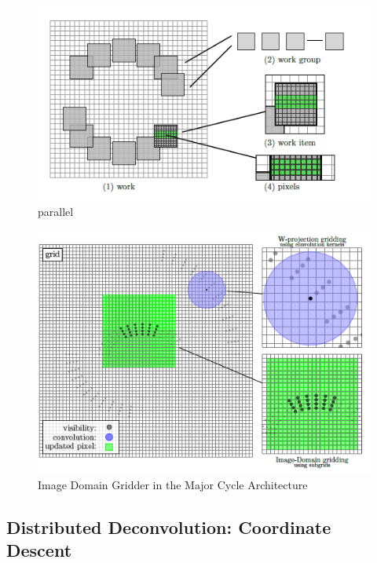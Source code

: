 \begin{figure}[h]
	\centering
	\includegraphics[width=0.40\linewidth]{./chapters/03.distribution/idg/paralellization.png}
	\caption{parallel}
	\label{distribution:idg:parallel}
\end{figure}

\begin{figure}[h]
	\centering
	\includegraphics[width=0.40\linewidth]{./chapters/03.distribution/idg/idg0.png}
	\caption{Image Domain Gridder in the Major Cycle Architecture}
	\label{distribution:idg:idg0}
\end{figure}



\subsection{Distributed Deconvolution: Coordinate Descent}


